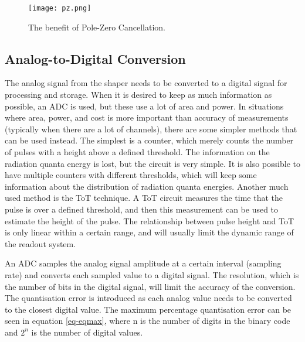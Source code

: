 \documentclass[../main/thesis.tex]{subfiles}
\begin{document}
\begin{figure}%
	\centering
	\texttt{[image: pz.png]}
	\caption{The benefit of Pole-Zero Cancellation. \citep{ORTEC} }
	\label{fig-shaper-pz}
\end{figure}


\subsection{Analog-to-Digital Conversion}
\label{t-adc}
The analog signal from the shaper needs to be converted to a digital signal for processing and storage. When it is desired to keep as much information as possible, an \gls{ADC} is used, but these use a lot of area and power. In situations where area, power, and cost is more important than accuracy of measurements (typically when there are a lot of channels), there are some simpler methods that can be used instead. The simplest is a counter, which merely counts the number of pulses with a height above a defined threshold. The information on the radiation quanta energy is lost, but the circuit is very simple. It is also possible to have multiple counters with different thresholds, which will keep some information about the distribution of radiation quanta energies. Another much used method is the \gls{ToT} technique. A \gls{ToT} circuit measures the time that the pulse is over a defined threshold, and then this measurement can be used to estimate the height of the pulse. The relationship between pulse height and \gls{ToT} is only linear within a certain range, and will usually limit the dynamic range of the readout system. \citep[chap. 6]{ToT}


An \gls{ADC} samples the analog signal amplitude at a certain interval (sampling rate) and converts each sampled value to a digital signal. The resolution, which is the number of bits in the digital signal, will limit the accuracy of the conversion. The quantisation error is introduced as each analog value needs to be converted to the closest digital value. The maximum percentage quantisation error can be seen in equation \ref{eq-eqmax}, where n is the number of digits in the binary code and $2^n$ is the number of digital values. \citep[chap. 10]{Bentley}
\end{document}
